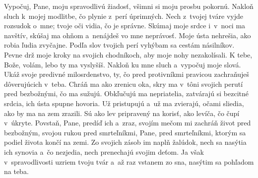 Vypočuj, Pane, moju spravodlivú žiadosť,
všimni si moju prosbu pokornú.
\versseparator
Nakloň sluch k~mojej modlitbe,
čo plynie z~perí úprimných.
\versseparator
Nech z~tvojej tváre vyjde rozsudok o~mne;
tvoje oči vidia, čo je správne.
\versseparator
Skúmaj moje srdce i~v~noci ma navštív,
skúšaj ma ohňom a~nenájdeš vo mne neprávosť.
\versseparator
Moje ústa nehrešia, ako robia ľudia zvyčajne.
Podľa slov tvojich perí vyhýbam sa cestám násilníkov.
\versseparator
Pevne drž moje kroky na svojich chodníkoch,
aby moje nohy nezakolísali.
\versseparator
K tebe, Bože, volám, lebo ty ma vyslyšíš.
Nakloň ku mne sluch a~vypočuj moje slová.
\versseparator
Ukáž svoje predivné milosrdenstvo,
ty, čo pred protivníkmi pravicou zachraňuješ
dôverujúcich v~teba.
Chráň ma ako zrenicu oka,
\versseparator
skry ma v~tôni svojich perutí
pred bezbožnými, čo ma sužujú.
\versseparator
Obkľučujú ma nepriatelia,
zatvárajú si bezcitné srdcia,
ich ústa spupne hovoria.
\versseparator
Už pristupujú a~už ma zvierajú,
očami sliedia, ako by ma na zem zrazili.
\versseparator
Sú ako lev pripravený na korisť,
ako levíča, čo čupí v~úkryte.
\versseparator
Povstaň, Pane, predíď ich a~zraz,
svojím mečom mi zachráň život pred bezbožným,
svojou rukou pred smrteľníkmi, Pane,
\versseparator
pred smrteľníkmi, ktorým sa podiel života končí na zemi.
Zo svojich zásob im naplň žalúdok,
\versseparator
nech sa nasýtia ich synovia
a~čo nezjedia, nech prenechajú svojim deťom.
\versseparator
Ja však v~spravodlivosti uzriem tvoju tvár
a~až raz vstanem zo sna, nasýtim sa pohľadom na teba.

